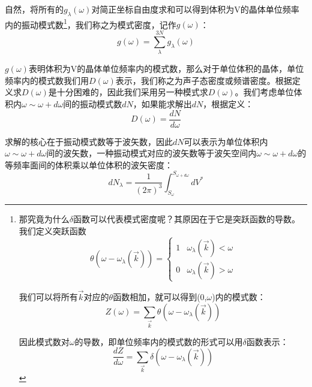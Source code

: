 \documentclass{ctexart}
\begin{document}
                自然，将所有的$g_\lambda(\omega)$对简正坐标自由度求和可以得到体积为V的晶体单位频率内的振动模式数\footnote{那究竟为什么$\delta$函数可以代表模式密度呢？其原因在于它是突跃函数的导数。我们定义突跃函数\begin{equation*}
                    \theta(\omega-\omega_\lambda(\vec{k}))=\begin{cases}
                    1 & \omega_\lambda(\vec{k})<\omega\\
                    0 & \omega_\lambda(\vec{k})>\omega
                    \end{cases}
                \end{equation*}
                
                我们可以将所有$\vec{k}$对应的$\theta$函数相加，就可以得到(0,$\omega$)内的模式数：
                \begin{equation*}
                    Z(\omega)=\sum_{\vec{k}}\theta(\omega-\omega_\lambda(\vec{k}))
                \end{equation*}
                
                因此模式数对$\omega$的导数，即单位频率内的模式数的形式可以用$\delta$函数表示：
                \begin{equation*}
                    \frac{dZ}{d\omega}=\sum_{\vec{k}}\delta(\omega-\omega_\lambda(\vec{k}))
                \end{equation*}}，我们称之为模式密度，记作$g(\omega)$：\begin{equation}
                    g(\omega)=\sum_\lambda^{3N}g_\lambda(\omega)
                \end{equation}
                
                $g(\omega)$表明体积为V的晶体单位频率内的模式数，那么对于单位体积的晶体，单位频率内的模式数我们用$D(\omega)$表示，我们称之为声子态密度或频谱密度。根据定义求$D(\omega)$是十分困难的，因此我们采用另一种模式求$D(\omega)$。我们考虑单位体积内$\omega\sim\omega+d\omega$间的振动模式数$dN$，如果能求解出$dN$，根据定义：
                \begin{equation}
                    D(\omega)=\frac{dN}{d\omega}
                \end{equation}
                
                求解的核心在于振动模式数等于波矢数，因此$dN$可以表示为单位体积内$\omega\sim\omega+d\omega$间的波矢数，一种振动模式对应的波矢数等于波矢空间内$\omega\sim\omega+d\omega$的等频率面间的体积乘以单位体积的波矢密度：
                \begin{equation}
                    dN_\lambda=\frac{1}{(2\pi)^3}\int_{S_\omega}^{S_{\omega+d\omega}} dV^*
                \end{equation}
                
\end{document}
